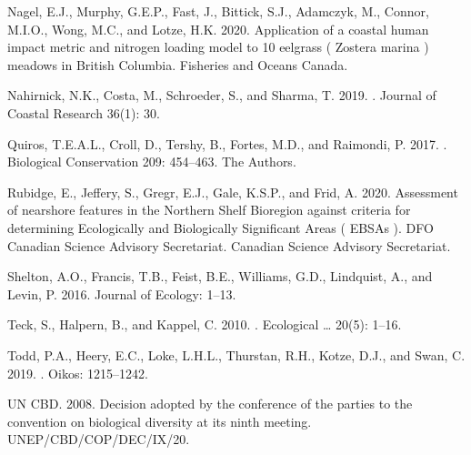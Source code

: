 \documentclass[12pt]{article}\usepackage[]{graphicx}\usepackage[]{color}
\begin{document}
\begin{CSLReferences}{1}{0}
%
Nagel, E.J., Murphy, G.E.P., Fast, J., Bittick, S.J., Adamczyk, M., Connor, M.I.O., Wong, M.C., and Lotze, H.K. 2020. Application of a coastal human impact metric and nitrogen loading model to 10 eelgrass ( {Zostera} marina ) meadows in {British Columbia}. {Fisheries and Oceans Canada}.

%
Nahirnick, N.K., Costa, M., Schroeder, S., and Sharma, T. 2019. . Journal of Coastal Research 36(1): 30.

%
Quiros, T.E.A.L., Croll, D., Tershy, B., Fortes, M.D., and Raimondi, P. 2017. . Biological Conservation 209: 454--463. {The Authors}.

%
Rubidge, E., Jeffery, S., Gregr, E.J., Gale, K.S.P., and Frid, A. 2020. Assessment of nearshore features in the {Northern Shelf Bioregion} against criteria for determining {Ecologically} and {Biologically Significant Areas} ( {EBSAs} ). DFO Canadian Science Advisory Secretariat. {Canadian Science Advisory Secretariat}.

%
Shelton, A.O., Francis, T.B., Feist, B.E., Williams, G.D., Lindquist, A., and Levin, P. 2016.  Journal of Ecology: 1--13.

%
Teck, S., Halpern, B., and Kappel, C. 2010. . Ecological \ldots{} 20(5): 1--16.

%
Todd, P.A., Heery, E.C., Loke, L.H.L., Thurstan, R.H., Kotze, D.J., and Swan, C. 2019. . Oikos: 1215--1242.

%
UN CBD. 2008. Decision adopted by the conference of the parties to the convention on biological diversity at its ninth meeting. UNEP/CBD/COP/DEC/IX/20.


\end{CSLReferences}
\end{document}
